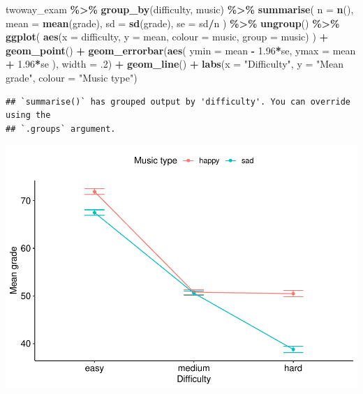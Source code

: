 \documentclass[
]{book}
\newenvironment{Shaded}{\begin{snugshade}}{\end{snugshade}}
\newcommand{\AttributeTok}[1]{\textcolor[rgb]{0.13,0.29,0.53}{#1}}
\newcommand{\DecValTok}[1]{\textcolor[rgb]{0.00,0.00,0.81}{#1}}
\newcommand{\FloatTok}[1]{\textcolor[rgb]{0.00,0.00,0.81}{#1}}
\newcommand{\FunctionTok}[1]{\textcolor[rgb]{0.13,0.29,0.53}{\textbf{#1}}}
\newcommand{\NormalTok}[1]{#1}
\newcommand{\SpecialCharTok}[1]{\textcolor[rgb]{0.81,0.36,0.00}{\textbf{#1}}}
\newcommand{\StringTok}[1]{\textcolor[rgb]{0.31,0.60,0.02}{#1}}
\begin{document}
\begin{Shaded}
\begin{Highlighting}[]
\NormalTok{twoway\_exam }\SpecialCharTok{\%\textgreater{}\%}
  \FunctionTok{group\_by}\NormalTok{(difficulty, music) }\SpecialCharTok{\%\textgreater{}\%}
  \FunctionTok{summarise}\NormalTok{(}
    \AttributeTok{n =} \FunctionTok{n}\NormalTok{(),}
    \AttributeTok{mean =} \FunctionTok{mean}\NormalTok{(grade),}
    \AttributeTok{sd =} \FunctionTok{sd}\NormalTok{(grade),}
    \AttributeTok{se =}\NormalTok{ sd}\SpecialCharTok{/}\NormalTok{n}
\NormalTok{  ) }\SpecialCharTok{\%\textgreater{}\%}
  \FunctionTok{ungroup}\NormalTok{() }\SpecialCharTok{\%\textgreater{}\%}
  \FunctionTok{ggplot}\NormalTok{(}
    \FunctionTok{aes}\NormalTok{(}\AttributeTok{x =}\NormalTok{ difficulty, }\AttributeTok{y =}\NormalTok{ mean, }\AttributeTok{colour =}\NormalTok{ music, }\AttributeTok{group =}\NormalTok{ music) }
\NormalTok{  ) }\SpecialCharTok{+}
  \FunctionTok{geom\_point}\NormalTok{() }\SpecialCharTok{+}
  \FunctionTok{geom\_errorbar}\NormalTok{(}\FunctionTok{aes}\NormalTok{(}
    \AttributeTok{ymin =}\NormalTok{ mean }\SpecialCharTok{{-}} \FloatTok{1.96}\SpecialCharTok{*}\NormalTok{se,}
    \AttributeTok{ymax =}\NormalTok{ mean }\SpecialCharTok{+} \FloatTok{1.96}\SpecialCharTok{*}\NormalTok{se}
\NormalTok{  ), }\AttributeTok{width =}\NormalTok{ .}\DecValTok{2}\NormalTok{) }\SpecialCharTok{+}
  \FunctionTok{geom\_line}\NormalTok{() }\SpecialCharTok{+}
  \FunctionTok{labs}\NormalTok{(}\AttributeTok{x =} \StringTok{"Difficulty"}\NormalTok{, }\AttributeTok{y =} \StringTok{"Mean grade"}\NormalTok{, }\AttributeTok{colour =} \StringTok{"Music type"}\NormalTok{)}
\end{Highlighting}
\end{Shaded}

\begin{verbatim}
## `summarise()` has grouped output by 'difficulty'. You can override using the
## `.groups` argument.
\end{verbatim}

\includegraphics{_main_files/figure-latex/unnamed-chunk-236-1.pdf}
\end{document}
